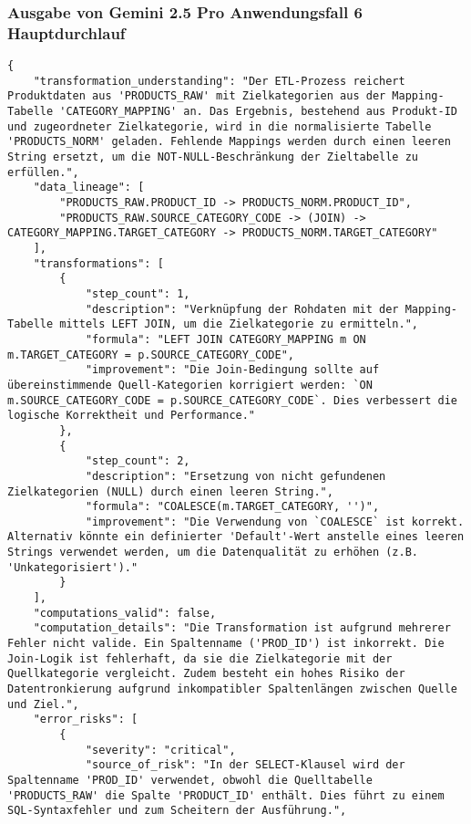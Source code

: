 \subsubsection{Ausgabe von Gemini 2.5 Pro Anwendungsfall 6 Hauptdurchlauf}\label{anhang:subsubsec:gemini_case6_prompt1}
\begin{lstlisting}[caption={Ausgabe: Gemini 2.5 Pro Anwendungsfall 6 Hauptdurchlauf},label={gemini_case6_prompt1}]
{
    "transformation_understanding": "Der ETL-Prozess reichert Produktdaten aus 'PRODUCTS_RAW' mit Zielkategorien aus der Mapping-Tabelle 'CATEGORY_MAPPING' an. Das Ergebnis, bestehend aus Produkt-ID und zugeordneter Zielkategorie, wird in die normalisierte Tabelle 'PRODUCTS_NORM' geladen. Fehlende Mappings werden durch einen leeren String ersetzt, um die NOT-NULL-Beschränkung der Zieltabelle zu erfüllen.",
    "data_lineage": [
        "PRODUCTS_RAW.PRODUCT_ID -> PRODUCTS_NORM.PRODUCT_ID",
        "PRODUCTS_RAW.SOURCE_CATEGORY_CODE -> (JOIN) -> CATEGORY_MAPPING.TARGET_CATEGORY -> PRODUCTS_NORM.TARGET_CATEGORY"
    ],
    "transformations": [
        {
            "step_count": 1,
            "description": "Verknüpfung der Rohdaten mit der Mapping-Tabelle mittels LEFT JOIN, um die Zielkategorie zu ermitteln.",
            "formula": "LEFT JOIN CATEGORY_MAPPING m ON m.TARGET_CATEGORY = p.SOURCE_CATEGORY_CODE",
            "improvement": "Die Join-Bedingung sollte auf übereinstimmende Quell-Kategorien korrigiert werden: `ON m.SOURCE_CATEGORY_CODE = p.SOURCE_CATEGORY_CODE`. Dies verbessert die logische Korrektheit und Performance."
        },
        {
            "step_count": 2,
            "description": "Ersetzung von nicht gefundenen Zielkategorien (NULL) durch einen leeren String.",
            "formula": "COALESCE(m.TARGET_CATEGORY, '')",
            "improvement": "Die Verwendung von `COALESCE` ist korrekt. Alternativ könnte ein definierter 'Default'-Wert anstelle eines leeren Strings verwendet werden, um die Datenqualität zu erhöhen (z.B. 'Unkategorisiert')."
        }
    ],
    "computations_valid": false,
    "computation_details": "Die Transformation ist aufgrund mehrerer Fehler nicht valide. Ein Spaltenname ('PROD_ID') ist inkorrekt. Die Join-Logik ist fehlerhaft, da sie die Zielkategorie mit der Quellkategorie vergleicht. Zudem besteht ein hohes Risiko der Datentronkierung aufgrund inkompatibler Spaltenlängen zwischen Quelle und Ziel.",
    "error_risks": [
        {
            "severity": "critical",
            "source_of_risk": "In der SELECT-Klausel wird der Spaltenname 'PROD_ID' verwendet, obwohl die Quelltabelle 'PRODUCTS_RAW' die Spalte 'PRODUCT_ID' enthält. Dies führt zu einem SQL-Syntaxfehler und zum Scheitern der Ausführung.",

\end{lstlisting}
